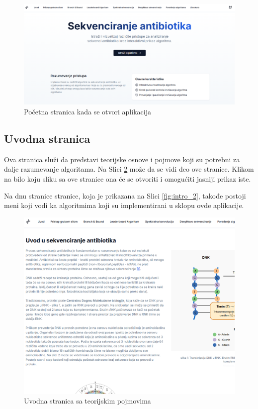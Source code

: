 \documentclass[12pt,oneside]{memoir}
\begin{document}
\begin{figure}[H]
\centering
\includegraphics[width=1\textwidth]{images/landing_page.png}
\caption{Početna stranica kada se otvori aplikacija}
\label{fig:landing_page}
\end{figure}

\subsection{Uvodna stranica}

Ova stranica služi da predstavi teorijske osnove i pojmove koji su potrebni za dalje razumevanje algoritama. Na Slici \ref{fig:intro_1} može da se vidi deo ove stranice. Klikom na bilo koju sliku sa ove stranice ona će se otvoriti i omogućiti jasniji prikaz iste.

Na dnu stranice stranice, koja je prikazana na Slici \ref{fig:intro_2}, takođe postoji meni koji vodi ka algoritmima koji su implementirani u sklopu ovde aplikacije.

\begin{figure}[H]
\centering
\includegraphics[width=1\textwidth]{images/intro_1.png}
\caption{Uvodna stranica sa teorijskim pojmovima}
\label{fig:intro_1}
\end{figure}
\end{document}

